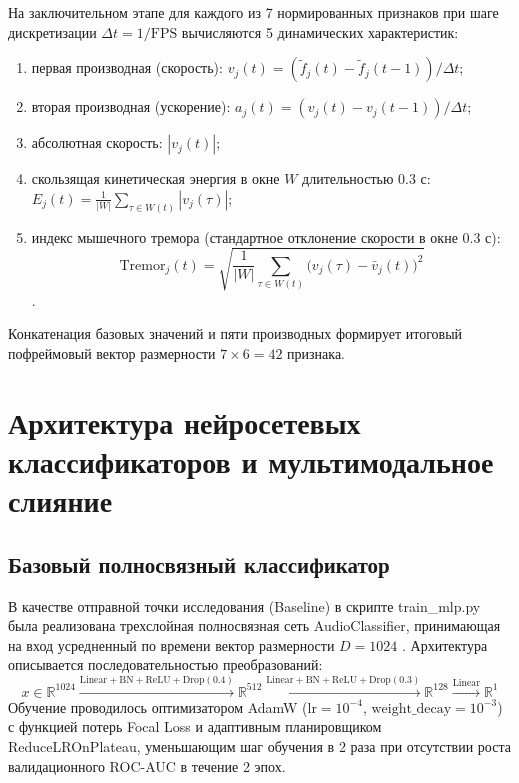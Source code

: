 \documentclass[a4paper,14pt]{extarticle}
\begin{document}
	На заключительном этапе для каждого из 7 нормированных признаков при шаге дискретизации $\Delta t = 1/\text{FPS}$ вычисляются 5 динамических характеристик:
	\begin{enumerate}
		\item первая производная (скорость): $v_j(t) = (\tilde{f}_j(t) - \tilde{f}_j(t-1)) / \Delta t$;
		\item вторая производная (ускорение): $a_j(t) = (v_j(t) - v_j(t-1)) / \Delta t$;
		\item абсолютная скорость: $|v_j(t)|$;
		\item скользящая кинетическая энергия в окне $W$ длительностью 0.3 с: $E_j(t) = \frac{1}{|W|} \sum_{\tau \in W(t)} |v_j(\tau)|$;
		\item индекс мышечного тремора (стандартное отклонение скорости в окне 0.3 с):
		\begin{equation}
			\text{Tremor}_j(t) = \sqrt{\frac{1}{|W|} \sum_{\tau \in W(t)} \big(v_j(\tau) - \bar{v}_j(t)\big)^2}
		\end{equation}.
	\end{enumerate}
	Конкатенация базовых значений и пяти производных формирует итоговый пофреймовый вектор размерности $7 \times 6 = 42$ признака.
	
	\newpage
	\section{Архитектура нейросетевых классификаторов и мультимодальное слияние}
	
	\subsection{Базовый полносвязный классификатор}
	В качестве отправной точки исследования (Baseline) в скрипте train\_\allowbreak mlp.py была реализована трехслойная полносвязная сеть AudioClassifier, принимающая на вход усредненный по времени вектор размерности $D = 1024$ \cite{wav2vec}. Архитектура описывается последовательностью преобразований:
	\begin{equation}
		x \in \mathbb{R}^{1024} \xrightarrow{\text{Linear}+\text{BN}+\text{ReLU}+\text{Drop}(0.4)} \mathbb{R}^{512} \xrightarrow{\text{Linear}+\text{BN}+\text{ReLU}+\text{Drop}(0.3)} \mathbb{R}^{128} \xrightarrow{\text{Linear}} \mathbb{R}^1
	\end{equation}
	Обучение проводилось оптимизатором AdamW ($\text{lr} = 10^{-4}$, $\text{weight\_decay} = 10^{-3}$) с функцией потерь Focal Loss \cite{focalloss} и адаптивным планировщиком ReduceLROnPlateau, уменьшающим шаг обучения в 2 раза при отсутствии роста валидационного ROC-AUC в течение 2 эпох.
	
\end{document}
